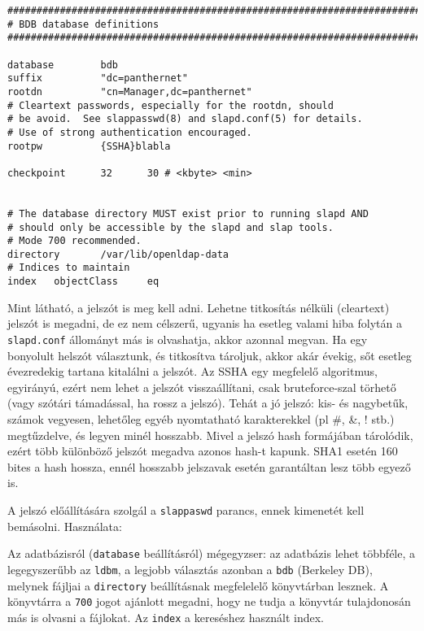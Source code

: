 \documentclass[fleqn,10pt,a4paper,titlepage]{article}
\newcommand{\ut}[1]{\vspace{5mm}\fbox{\parbox{130mm}{\texttt{\noindent{#1}}}}\vspace{5mm}}
\begin{document}
\begin{Verbatim}
#######################################################################
# BDB database definitions
#######################################################################

database        bdb
suffix          "dc=panthernet"
rootdn          "cn=Manager,dc=panthernet"
# Cleartext passwords, especially for the rootdn, should
# be avoid.  See slappasswd(8) and slapd.conf(5) for details.
# Use of strong authentication encouraged.
rootpw          {SSHA}blabla

checkpoint      32      30 # <kbyte> <min>


# The database directory MUST exist prior to running slapd AND
# should only be accessible by the slapd and slap tools.
# Mode 700 recommended.
directory       /var/lib/openldap-data
# Indices to maintain
index   objectClass     eq
\end{Verbatim}

  Mint látható, a jelszót is meg kell adni. Lehetne titkosítás nélküli (cleartext) jelszót is megadni, de ez nem
  célszerű, ugyanis ha esetleg valami hiba folytán a \texttt{slapd.conf} állományt más is olvashatja, akkor azonnal
  megvan. Ha egy bonyolult helszót választunk, és titkosítva tároljuk, akkor akár évekig, sőt esetleg évezredekig
  tartana kitalálni a jelszót. Az SSHA egy megfelelő algoritmus, egyirányú, ezért
  nem lehet a jelszót visszaállítani, csak bruteforce-szal törhető (vagy szótári támadással, ha rossz a jelszó). Tehát a
  jó jelszó: kis-  és nagybetűk, számok vegyesen, lehetőleg egyéb nyomtatható karakterekkel (pl \#, \&, ! stb.)
  megtűzdelve, és legyen minél hosszabb. Mivel a jelszó hash formájában tárolódik, ezért több különböző jelszót megadva
  azonos hash-t kapunk. SHA1 esetén 160 bites a hash hossza, ennél hosszabb jelszavak esetén garantáltan lesz több
  egyező is.
  

  A jelszó előállítására szolgál a \texttt{slappaswd} parancs, ennek kimenetét kell bemásolni. Használata:\\
  \ut{slappasswd -h {SSHA}}

  
  Az adatbázisról (\texttt{database} beállításról) mégegyzser: az adatbázis lehet többféle, a legegyszerűbb az
  \texttt{ldbm}, a legjobb választás azonban a  \texttt{bdb} (Berkeley DB), melynek fájljai a \texttt{directory}
  beállításnak megfelelelő könyvtárban lesznek. A könyvtárra a \texttt{700} jogot ajánlott megadni, hogy ne tudja a
  könyvtár tulajdonosán más is olvasni a fájlokat. Az  \texttt{index} a  kereséshez használt index.
  
\end{document}
